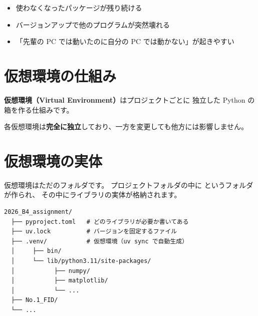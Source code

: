 \begin{itemize}
  \item 使わなくなったパッケージが残り続ける
  \item バージョンアップで他のプログラムが突然壊れる
  \item 「先輩の PC では動いたのに自分の PC では動かない」が起きやすい
\end{itemize}

\section{仮想環境の仕組み}

\textbf{仮想環境（Virtual Environment）}はプロジェクトごとに
独立した Python の箱を作る仕組みです。

\begin{center}
\end{center}

各仮想環境は\textbf{完全に独立}しており、一方を変更しても他方には影響しません。

\section{仮想環境の実体}

仮想環境はただのフォルダです。
プロジェクトフォルダの中に  というフォルダが作られ、
その中にライブラリの実体が格納されます。

\begin{wslbox}
\begin{lstlisting}[style=bash]
2026_B4_assignment/
  ├── pyproject.toml   # どのライブラリが必要か書いてある
  ├── uv.lock          # バージョンを固定するファイル
  ├── .venv/           # 仮想環境（uv sync で自動生成）
  │     ├── bin/
  │     └── lib/python3.11/site-packages/
  │           ├── numpy/
  │           ├── matplotlib/
  │           └── ...
  ├── No.1_FID/
  └── ...
\end{lstlisting}
\end{wslbox}

